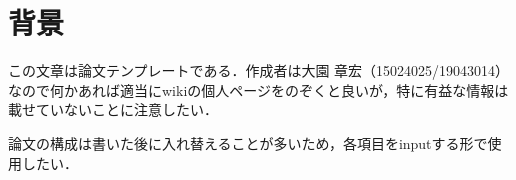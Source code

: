 \section{背景}
この文章は論文テンプレートである．作成者は大園 章宏（15024025/19043014）なので何かあれば適当にwikiの個人ページをのぞくと良いが，特に有益な情報は載せていないことに注意したい．\par
論文の構成は書いた後に入れ替えることが多いため，各項目をinputする形で使用したい．
